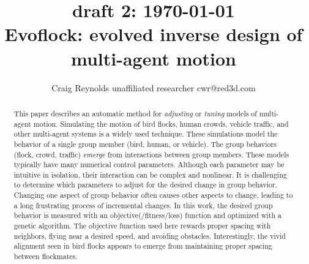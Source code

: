 \documentclass[letterpaper]{article}
\begin{document}
\title{{\tiny draft 2: \today}\\Evoflock: evolved inverse design of multi-agent motion}

\author{Craig Reynolds\authorcr
    unaffiliated researcher\authorcr 
    cwr@red3d.com}


\captionsetup{hypcap=false}


\date{}

\maketitle



\begin{abstract}
    This paper describes an automatic method for \textit{adjusting} or \textit{tuning} models of multi-agent motion. Simulating the motion of bird flocks, human crowds, vehicle traffic, and other multi-agent systems is a widely used technique. These simulations model the behavior of a single group member (bird, human, or vehicle). The group behaviors (flock, crowd, traffic) \textit{emerge} from interactions between group members. These models typically have many numerical control parameters. Although each parameter may be intuitive in isolation, their interaction can be complex and nonlinear. It is challenging to determine which parameters to adjust for the desired change in group behavior. Changing one aspect of group behavior often causes other aspects to change, leading to a long frustrating process of incremental changes. In this work, the desired group behavior is measured with an objective(/fitness/loss) function and optimized with a genetic algorithm. The objective function used here rewards proper spacing with neighbors, flying near a desired speed, and avoiding obstacles. Interestingly, the vivid alignment seen in bird flocks appears to emerge from maintaining proper spacing between flockmates.
\end{abstract}
\end{document}

